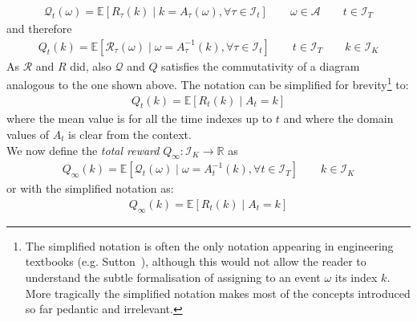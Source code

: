 \documentclass[]{scrartcl}
\begin{document}
\begin{align}\label{def:mathcalQt}
\mathcal{Q}_t(\omega) = \mathbb{E} \left[ R_{\tau}(k)\mid k = A_{\tau}(\omega), \forall \tau \in \mathcal{I}_t \right]
\qquad 
\omega \in \mathcal{A}
\qquad
t \in \mathcal{I}_T
\end{align}
and therefore
\begin{align}\label{def:Qt}
Q_t(k) = \mathbb{E} \left[ \mathcal{R}_{\tau}(\omega)\mid \omega = A_{\tau}^{-1}(k), \forall \tau \in \mathcal{I}_t \right]
\qquad
t \in \mathcal{I}_T
\qquad
k \in \mathcal{I}_K
\end{align}
As $\mathcal{R}$ and $R$ did, also $\mathcal{Q}$ and $Q$ satisfies the commutativity of a diagram analogous to the one shown above. The notation can be simplified for brevity\footnote{
    The simplified notation is often the only notation appearing in engineering textbooks (e.g. Sutton~\cite{sutton2018reinforcement}), although this would not allow the reader to understand the subtle formalisation of assigning to an event $\omega$ its index $k$. More tragically the simplified notation makes most of the concepts introduced so far pedantic and irrelevant.
} to:
\begin{align}\label{def:mathcalQt_simple}
Q_t(k) = \mathbb{E} \left[ R_{t}(k) \mid A_{t} = k \right]
\end{align}
where the mean value is for all the time indexes up to $t$ and where the domain values of $A_t$ is clear from the context. \\

We now define the \emph{total reward} $Q_{\infty}: \mathcal{I}_K \rightarrow \mathbb{R}$ as
\begin{align}\label{def:mathcalQinf}
Q_{\infty}(k) = \mathbb{E} \left[ \mathcal{Q}_{t}(\omega) \mid \omega = A^{-1}_{t}(k), \forall t \in \mathcal{I}_T \right]
\qquad
k \in \mathcal{I}_K 
\end{align}
or with the simplified notation as:
\begin{align}\label{def:mathcalQinf_simple}
Q_{\infty}(k) = \mathbb{E} \left[ R_{t}(k) \mid A_{t} = k \right]
\end{align}
\end{document}
